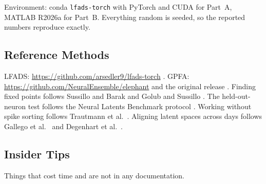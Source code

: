 \documentclass[11pt]{article}
\begin{document}
Environment: conda \texttt{lfads-torch} with PyTorch and CUDA for Part~A, MATLAB
R2026a for Part~B. Everything random is seeded, so the reported numbers reproduce
exactly.

\subsection{Reference Methods}

LFADS: \url{https://github.com/arsedler9/lfads-torch} \cite{sedler2023}. GPFA:
\url{https://github.com/NeuralEnsemble/elephant} and the original release
\cite{yu2009}. Finding fixed points follows Sussillo and Barak
\cite{sussillo2013} and Golub and Sussillo \cite{golub2018}. The held-out-neuron
test follows the Neural Latents Benchmark protocol \cite{pei2021}. Working
without spike sorting follows Trautmann et al.\ \cite{trautmann2019}. Aligning
latent spaces across days follows Gallego et al.\ \cite{gallego2020} and
Degenhart et al.\ \cite{degenhart2020}.

\subsection{Insider Tips}\label{sec:tips}

Things that cost time and are not in any documentation.
\end{document}
